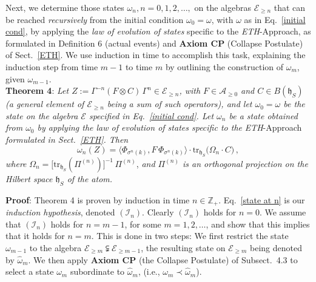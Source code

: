 \documentclass[12pt]{article}
\begin{document}
Next, we determine those states $\omega_n, n=0,1,2, \dots,$ on the algebras $\mathcal{E}_{\geq n}$ that can be 
reached \textit{recursively} from the initial condition $\omega_0 = \omega$, with $\omega$ as in Eq.~\eqref{initial cond}, 
by applying the \textit{law of evolution of states} specific to the \textit{ETH}-Approach, as formulated in Definition 6 
(actual events) and {\bf{Axiom CP}} (Collapse Postulate) of Sect.~\ref{ETH}. We use induction in time to accomplish this 
task, explaining the induction step from time $m-1$ to time $m$ by outlining the construction of $\omega_m$, given 
$\omega_{m-1}$. \\
 
{\bf{Theorem 4}}: \textit{Let $Z:= \Gamma^{-n}(F\otimes C)\,\Gamma^{n} \in \mathcal{E}_{\geq n}$, with 
$F\in \mathcal{A}_{\geq 0}$ and $C\in B(\mathfrak{h}_S)$ (a general element of $\mathcal{E}_{\geq n}$ being a sum of such operators), and let $\omega_0 =\omega$ be the state on the algebra 
$\mathcal{E}$ specified in Eq.~\eqref{initial cond}. Let $\omega_n$ be a state obtained from $\omega_0$ by applying 
the law of evolution of states specific to the} \textit{ETH}-Approach \textit{formulated in Sect.~\ref{ETH}. Then}
\begin{equation}\label{state at n}
\omega_{n}(Z)= \langle \Phi_{\sigma^{n}({k})}, F \,\Phi_{\sigma^{n}({k})}\rangle 
\cdot \text{tr}_{\mathfrak{h}_S}\big(\Omega_n \cdot C\big)\,,
\end{equation}
\textit{where} $\Omega_{n} = \big[\text{tr}_{\mathfrak{h}_S} (\Pi^{(n)})\big]^{-1} \,\Pi^{(n)}$, \textit{and $\Pi^{(n)}$ 
is an orthogonal projection on the Hilbert space $\mathfrak{h}_S$ of the atom.}

{\bf{Proof}}:
Theorem 4 is proven by induction in time $n\in \mathbb{Z}_{+}$. Eq.~\eqref{state at n} is our \textit{induction hypothesis}, denoted $(\mathcal{I}_{n})$. 
Clearly $(\mathcal{I}_{n})$ holds for $n=0$. We assume that $(\mathcal{I}_{n})$ holds for $n=m-1$, for some $m=1,2,\dots$, 
and show that this implies that it holds for $n=m$. This is done in two steps: We first restrict the state $\omega_{m-1}$ 
to the algebra $\mathcal{E}_{\geq m}\subsetneqq \mathcal{E}_{\geq m-1}$, the resulting state on $\mathcal{E}_{\geq m}$ 
being denoted by $\widehat{\omega}_m$. We then apply {\bf{Axiom CP}} (the Collapse Postulate) of Subsect.~4.3 to 
select a state $\omega_m$ subordinate to $\widehat{\omega}_m$, (i.e., $\omega_m \prec \widehat{\omega}_m$).
\end{document}
